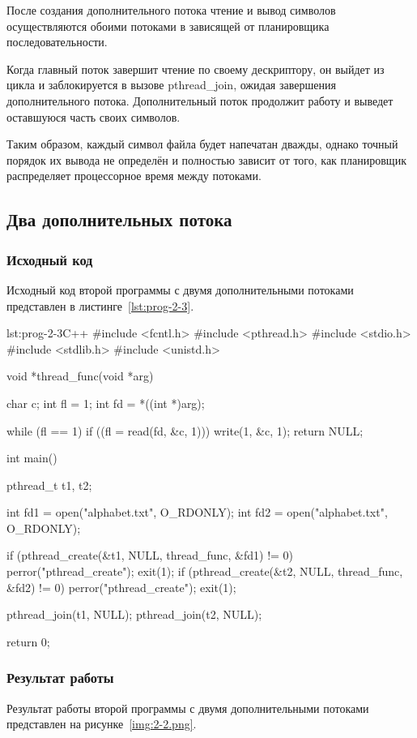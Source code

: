 После создания дополнительного потока чтение и вывод символов осуществляются 
обоими потоками в зависящей от планировщика последовательности.

Когда главный поток завершит чтение по своему дескриптору, он выйдет из цикла 
и заблокируется в вызове pthread\_join, ожидая завершения дополнительного потока. 
Дополнительный поток продолжит работу и выведет оставшуюся часть своих символов.

Таким образом, каждый символ файла будет напечатан дважды, однако точный 
порядок их вывода не определён и полностью зависит от того, как планировщик 
распределяет процессорное время между потоками.

\subsection{Два дополнительных потока}
\subsubsection{Исходный код}
Исходный код второй программы с двумя дополнительными потоками 
представлен в листинге~\ref{lst:prog-2-3}.

\begin{listing}{lst:prog-2-3}{C++}
#include <fcntl.h>
#include <pthread.h>
#include <stdio.h>
#include <stdlib.h>
#include <unistd.h>

void *thread_func(void *arg)
{
    char c;
    int fl = 1;
    int fd = *((int *)arg);

    while (fl == 1)
    {
        if ((fl = read(fd, &c, 1)))
            write(1, &c, 1);
    }
    return NULL;
}

int main()
{
    pthread_t t1, t2;

    int fd1 = open("alphabet.txt", O_RDONLY);
    int fd2 = open("alphabet.txt", O_RDONLY);

    if (pthread_create(&t1, NULL, thread_func, &fd1) != 0)
    {
        perror("pthread_create");
        exit(1);
    }
    if (pthread_create(&t2, NULL, thread_func, &fd2) != 0)
    {
        perror("pthread_create");
        exit(1);
    }

    pthread_join(t1, NULL);
    pthread_join(t2, NULL);

    return 0;
}
\end{listing}

\subsubsection{Результат работы}
Результат работы второй программы с двумя дополнительными потоками 
представлен на рисунке~\ref{img:2-2.png}.

